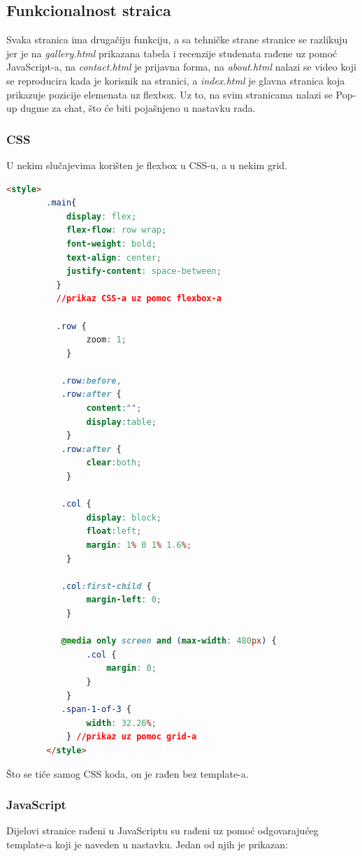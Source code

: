 \documentclass[a4paper]{article}
\begin{document}
\subsection{Funkcionalnost straica}

Svaka stranica ima drugačiju funkciju, a sa tehničke strane stranice se razlikuju jer je na \emph{gallery.html} prikazana tabela i recenzije studenata rađene uz pomoć JavaScript-a, na \emph{contact.html} je prijavna forma, na \emph{about.html} nalazi se video koji se reproducira kada je korisnik na stranici, a \emph{index.html} je glavna stranica koja prikazuje pozicije elemenata uz flexbox. Uz to, na svim stranicama nalazi se Pop-up dugme za chat, što će biti pojašnjeno u nastavku rada. 

\subsubsection{CSS}
U nekim slučajevima korišten je flexbox u CSS-u, a u nekim grid.
\begin{lstlisting}[language=HTML]
        <style>
        .main{
            display: flex;  
            flex-flow: row wrap;
            font-weight: bold;
            text-align: center;
            justify-content: space-between;
          }
          //prikaz CSS-a uz pomoc flexbox-a
          
          .row {
                zoom: 1;
            }
            
           .row:before,
           .row:after {
                content:"";
                display:table;
            }
           .row:after {
                clear:both;
            }
            
           .col {
                display: block;
                float:left;
                margin: 1% 0 1% 1.6%;
            }
            
           .col:first-child { 
                margin-left: 0; 
            }
            
           @media only screen and (max-width: 480px) {
                .col { 
                    margin: 0;
                }
            }
           .span-1-of-3 {
                width: 32.26%; 
            } //prikaz uz pomoc grid-a
        </style>
\end{lstlisting}
Što se tiče samog CSS koda, on je rađen bez template-a.

\subsubsection{JavaScript}
Dijelovi stranice rađeni u JavaScriptu su rađeni uz pomoć odgovarajućeg template-a koji je naveden u nastavku. Jedan od njih je prikazan:
\end{document}
